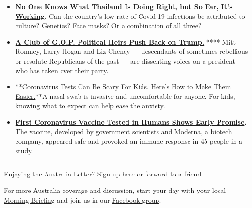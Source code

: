 \begin{itemize}
\item
  \textbf{\href{https://www.nytimes3xbfgragh.onion/2020/07/16/world/asia/coronavirus-thailand-photos.html?action=click\&module=Editors\%20Picks\&pgtype=Homepage}{No
  One Knows What Thailand Is Doing Right, but So Far, It's Working}.}
  Can the country's low rate of Covid-19 infections be attributed to
  culture? Genetics? Face masks? Or a combination of all three?
\item
  \textbf{\href{https://www.nytimes3xbfgragh.onion/2020/07/16/us/politics/trump-republicans.html?action=click\&module=Top\%20Stories\&pgtype=Homepage}{A
  Club of G.O.P. Political Heirs Push Back on Trump.}} **** Mitt Romney,
  Larry Hogan and Liz Cheney --- descendants of sometimes rebellious or
  resolute Republicans of the past --- are dissenting voices on a
  president who has taken over their party.
\item
  **\href{https://www.nytimes3xbfgragh.onion/2020/07/15/parenting/kids-covid-19-test.html?surface=home-living-vi\&fellback=false\&req_id=284471978\&algo=identity\&imp_id=619355117\&action=click\&module=Smarter\%20Living\&pgtype=Homepage}{Coronavirus
  Tests Can Be Scary For Kids. Here's How to Make Them Easier.}**A nasal
  swab is invasive and uncomfortable for anyone. For kids, knowing what
  to expect can help ease the anxiety.
\item
  \textbf{\href{https://www.nytimes3xbfgragh.onion/2020/07/14/health/cornavirus-vaccine-moderna.html?surface=home-discovery-vi-prg\&fellback=false\&req_id=482187727\&algo=identity\&imp_id=143330218\&action=click\&module=Science\%20\%20Technology\&pgtype=Homepage}{First
  Coronavirus Vaccine Tested in Humans Shows Early Promise}.} The
  vaccine, developed by government scientists and Moderna, a biotech
  company, appeared safe and provoked an immune response in 45 people in
  a study.
\end{itemize}

\begin{center}\rule{0.5\linewidth}{\linethickness}\end{center}

Enjoying the Australia Letter?
\href{https://www.nytimes3xbfgragh.onion/newsletters/australia-letter?utm_source=ausend}{Sign
up here} or forward to a friend.

For more Australia coverage and discussion, start your day with your
local
\href{https://www.nytimes3xbfgragh.onion/interactive/2018/briefing/global-morning-briefing-newsletter-signup.html?utm_source=ausend}{Morning
Briefing} and join us in our
\href{https://www.facebookcorewwwi.onion/groups/nytaustralia/}{Facebook
group}.

